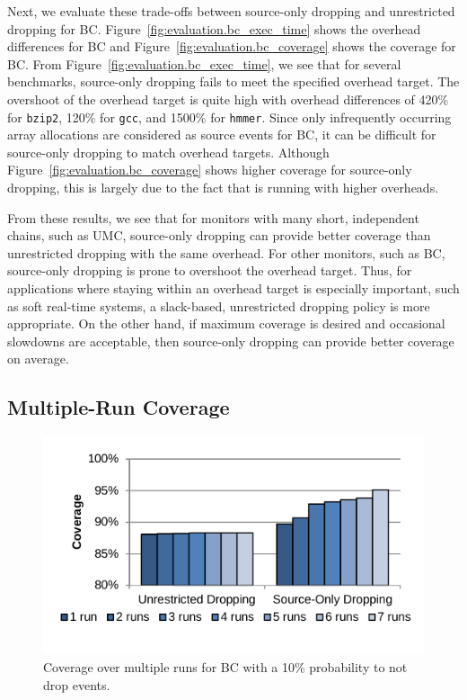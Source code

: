 Next, we evaluate these trade-offs between source-only dropping and unrestricted dropping for BC.
Figure~\ref{fig:evaluation.bc_exec_time} shows the overhead differences for BC
and Figure~\ref{fig:evaluation.bc_coverage} shows the coverage for BC.
From Figure~\ref{fig:evaluation.bc_exec_time}, we see that for several
benchmarks, source-only dropping fails to meet the specified overhead target.
The overshoot of the overhead target is quite high with overhead differences
of 420\% for {\tt bzip2}, 120\% for {\tt gcc}, and 1500\% for {\tt hmmer}.
Since only infrequently occurring array allocations are considered as source events for BC, it can be 
difficult for source-only dropping to match overhead targets. Although
Figure~\ref{fig:evaluation.bc_coverage} shows higher coverage for
source-only dropping, this is largely due to the fact that is running with
higher overheads.

From these results, we see that for monitors with many short, independent
chains, such as UMC, source-only dropping can provide better coverage than
unrestricted dropping with the same overhead. For other monitors, such as BC,
source-only dropping is prone to overshoot the overhead target.
Thus, for applications where staying within an overhead target is especially
important, such as soft real-time systems, a slack-based, unrestricted dropping
policy is more appropriate. On the other hand, if maximum coverage is desired
and occasional slowdowns are acceptable, then source-only dropping can provide
better coverage on average.

\subsection{Multiple-Run Coverage}

\begin{figure}
  \begin{center}
    \includegraphics[width=\columnwidth, clip=true, trim=0 0.3in 0 0.1in]{figs/data_multirun_coverage.pdf}
    \vspace{-0.2in}
    \caption{Coverage over multiple runs for BC with a 10\% probability to not drop events.}
    \label{fig:evaluation.multirun}
    \vspace{-0.1in}
  \end{center}
\end{figure}

